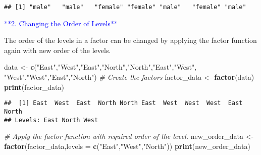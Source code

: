 \documentclass[
]{article}
\newenvironment{Shaded}{\begin{snugshade}}{\end{snugshade}}
\newcommand{\AttributeTok}[1]{\textcolor[rgb]{0.13,0.29,0.53}{#1}}
\newcommand{\CommentTok}[1]{\textcolor[rgb]{0.56,0.35,0.01}{\textit{#1}}}
\newcommand{\FunctionTok}[1]{\textcolor[rgb]{0.13,0.29,0.53}{\textbf{#1}}}
\newcommand{\NormalTok}[1]{#1}
\newcommand{\OtherTok}[1]{\textcolor[rgb]{0.56,0.35,0.01}{#1}}
\newcommand{\SpecialCharTok}[1]{\textcolor[rgb]{0.81,0.36,0.00}{\textbf{#1}}}
\newcommand{\StringTok}[1]{\textcolor[rgb]{0.31,0.60,0.02}{#1}}
\begin{document}
\begin{Shaded}
\end{Shaded}

\begin{verbatim}
## [1] "male"   "male"   "female" "female" "male"   "female" "male"
\end{verbatim}

\textcolor{blue}{**2. Changing the Order of Levels**}

The order of the levels in a factor can be changed by applying the
factor function again with new order of the levels.

\begin{Shaded}
\begin{Highlighting}[]
\NormalTok{data }\OtherTok{\textless{}{-}} \FunctionTok{c}\NormalTok{(}\StringTok{"East"}\NormalTok{,}\StringTok{"West"}\NormalTok{,}\StringTok{"East"}\NormalTok{,}\StringTok{"North"}\NormalTok{,}\StringTok{"North"}\NormalTok{,}\StringTok{"East"}\NormalTok{,}\StringTok{"West"}\NormalTok{,}
   \StringTok{"West"}\NormalTok{,}\StringTok{"West"}\NormalTok{,}\StringTok{"East"}\NormalTok{,}\StringTok{"North"}\NormalTok{)}
\CommentTok{\# Create the factors}
\NormalTok{factor\_data }\OtherTok{\textless{}{-}} \FunctionTok{factor}\NormalTok{(data)}
\FunctionTok{print}\NormalTok{(factor\_data)}
\end{Highlighting}
\end{Shaded}

\begin{verbatim}
##  [1] East  West  East  North North East  West  West  West  East  North
## Levels: East North West
\end{verbatim}

\begin{Shaded}
\begin{Highlighting}[]
\CommentTok{\# Apply the factor function with required order of the level.}
\NormalTok{new\_order\_data }\OtherTok{\textless{}{-}} \FunctionTok{factor}\NormalTok{(factor\_data,}\AttributeTok{levels =} \FunctionTok{c}\NormalTok{(}\StringTok{"East"}\NormalTok{,}\StringTok{"West"}\NormalTok{,}\StringTok{"North"}\NormalTok{))}
\FunctionTok{print}\NormalTok{(new\_order\_data)}
\end{Highlighting}
\end{Shaded}
\end{document}
